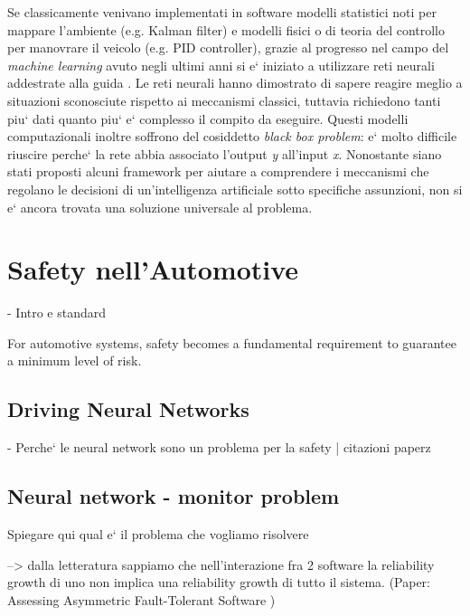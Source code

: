 Se classicamente venivano implementati in software modelli statistici noti per mappare l'ambiente (e.g. Kalman filter) e modelli fisici o di teoria del controllo per manovrare il veicolo (e.g. PID controller), grazie al progresso nel campo del \textsl{machine learning} avuto negli ultimi anni si e` iniziato a utilizzare reti neurali addestrate alla guida \cite{1} \cite{2}.\newline
Le reti neurali hanno dimostrato di sapere reagire meglio a situazioni sconosciute rispetto ai meccanismi classici, tuttavia richiedono tanti piu` dati quanto piu` e` complesso il compito da eseguire.\newline
Questi modelli computazionali inoltre soffrono del cosiddetto \textsl{black box problem}: e` molto difficile riuscire perche` la rete abbia associato l'output \textsl{y} all'input \textsl{x}. Nonostante siano stati proposti alcuni framework \cite{3} per aiutare a comprendere i meccanismi che regolano le decisioni di un'intelligenza artificiale sotto specifiche assunzioni, non si e` ancora trovata una soluzione universale al problema.\newline


\section{Safety nell'Automotive}

-  Intro e standard

For automotive systems, safety becomes a fundamental requirement to guarantee a minimum level of risk.\newline


\subsection{Driving Neural Networks}

 - Perche` le neural network sono un problema per la safety | citazioni paperz

\subsection{Neural network - monitor problem}

Spiegare qui qual e` il problema che vogliamo risolvere

--> dalla letteratura sappiamo che nell'interazione fra 2 software la reliability growth di uno non implica una reliability growth di tutto il sistema. (Paper: Assessing Asymmetric Fault-Tolerant Software )

